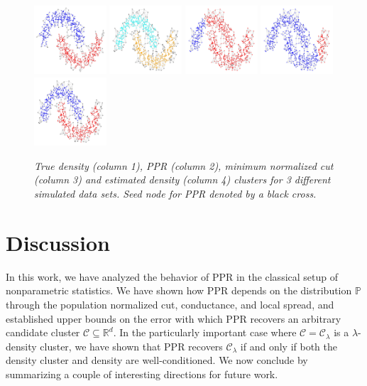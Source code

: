 \documentclass[11pt,twoside]{article}
\newcommand{\Reals}{\mathbb{R}}
\newcommand{\1}{\mathbf{1}}
\newcommand{\Rd}{\Reals^d}
\newcommand{\mc}[1]{\mathcal{#1}}
\newcommand{\Pbb}{\mathbb{P}}
\begin{document}
\begin{figure}
	\includegraphics[width=0.24\textwidth]{plots/experiment_2/row2_density_cluster}
	\includegraphics[width=0.24\textwidth]{plots/experiment_2/row3_true_density_cluster}
	\includegraphics[width=0.24\textwidth]{plots/experiment_2/row3_ppr_cluster}
	\includegraphics[width=0.24\textwidth]{plots/experiment_2/row3_conductance_cluster}
	\includegraphics[width=0.24\textwidth]{plots/experiment_2/row3_density_cluster}
	\caption{\it\small True density (column 1), PPR (column 2), minimum normalized
		cut (column 3) and estimated density (column 4) clusters for 3 different 
		simulated data sets. Seed node for PPR denoted by a black cross.} 
	\label{fig:moons}
\end{figure}


\section{Discussion}
\label{sec:discussion}
In this work, we have analyzed the behavior of PPR in the classical setup of nonparametric statistics. We have shown how PPR depends on the distribution $\Pbb$ through the population normalized cut, conductance, and local spread, and established upper bounds on the error with which PPR recovers an arbitrary candidate cluster $\mc{C} \subseteq \Rd$.  In the particularly important case where $\mc{C} = \mc{C}_{\lambda}$ is a $\lambda$-density cluster, we have shown that PPR recovers $\mc{C}_{\lambda}$ if and only if both the density cluster and density are well-conditioned. We now conclude by summarizing a couple of interesting directions for future work.
\end{document}
